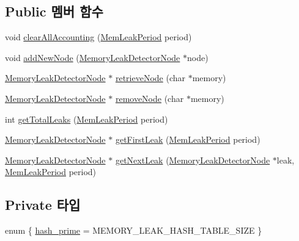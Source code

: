 \subsection*{Public 멤버 함수}
\begin{DoxyCompactItemize}
\item 
void \hyperlink{struct_memory_leak_detector_table_a6c18f981e1c2139528a10aa573ffeaa9}{clear\+All\+Accounting} (\hyperlink{_memory_leak_detector_8h_ab248e6cc6c6699b88b002286d8a3ed76}{Mem\+Leak\+Period} period)
\item 
void \hyperlink{struct_memory_leak_detector_table_a78f2e89c0db3e4216dcd2061d70dea84}{add\+New\+Node} (\hyperlink{struct_memory_leak_detector_node}{Memory\+Leak\+Detector\+Node} $\ast$node)
\item 
\hyperlink{struct_memory_leak_detector_node}{Memory\+Leak\+Detector\+Node} $\ast$ \hyperlink{struct_memory_leak_detector_table_aa1655267a6cde38557847aca1e545a77}{retrieve\+Node} (char $\ast$memory)
\item 
\hyperlink{struct_memory_leak_detector_node}{Memory\+Leak\+Detector\+Node} $\ast$ \hyperlink{struct_memory_leak_detector_table_aaa0452383ce806d8a7248cb567813f84}{remove\+Node} (char $\ast$memory)
\item 
int \hyperlink{struct_memory_leak_detector_table_ae203c76563a188474a816e4ef8d8aa06}{get\+Total\+Leaks} (\hyperlink{_memory_leak_detector_8h_ab248e6cc6c6699b88b002286d8a3ed76}{Mem\+Leak\+Period} period)
\item 
\hyperlink{struct_memory_leak_detector_node}{Memory\+Leak\+Detector\+Node} $\ast$ \hyperlink{struct_memory_leak_detector_table_a1b95cd1a5e8372a8f795f2d3387ae065}{get\+First\+Leak} (\hyperlink{_memory_leak_detector_8h_ab248e6cc6c6699b88b002286d8a3ed76}{Mem\+Leak\+Period} period)
\item 
\hyperlink{struct_memory_leak_detector_node}{Memory\+Leak\+Detector\+Node} $\ast$ \hyperlink{struct_memory_leak_detector_table_a4aafc8945d8152ee287b651ffd2ede97}{get\+Next\+Leak} (\hyperlink{struct_memory_leak_detector_node}{Memory\+Leak\+Detector\+Node} $\ast$leak, \hyperlink{_memory_leak_detector_8h_ab248e6cc6c6699b88b002286d8a3ed76}{Mem\+Leak\+Period} period)
\end{DoxyCompactItemize}
\subsection*{Private 타입}
\begin{DoxyCompactItemize}
\item 
enum \{ \hyperlink{struct_memory_leak_detector_table_a34df7cc7f69a8ec535eec8a524dcbaf9af69a0171f9288f3c7d098803381facbf}{hash\+\_\+prime} = M\+E\+M\+O\+R\+Y\+\_\+\+L\+E\+A\+K\+\_\+\+H\+A\+S\+H\+\_\+\+T\+A\+B\+L\+E\+\_\+\+S\+I\+ZE
 \}
\end{DoxyCompactItemize}

